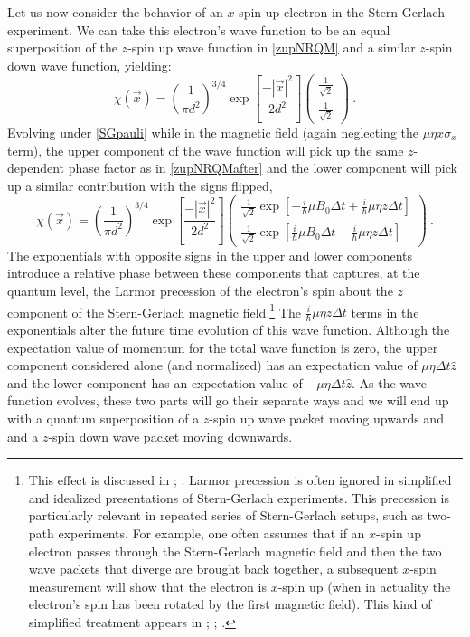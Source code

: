 \documentclass[onecolumn,secnumarabic,amsmath,amssymb,balancelastpage,nofootinbib]{article}
\begin{document}
Let us now consider the behavior of an $x$-spin up electron in the Stern-Gerlach experiment.  We can take this electron's wave function to be an equal superposition of the $z$-spin up wave function in \eqref{zupNRQM} and a similar $z$-spin down wave function, yielding:
\begin{equation}
\chi(\vec{x}) = \left(\frac{1}{\pi d^2}\right)^{3/4}  \exp\left[\frac{-|\vec{x}|^2}{2 d^2}\right] \left(\begin{matrix} \frac{1}{\sqrt{2}}\\ \frac{1}{\sqrt{2}} \end{matrix}\right)
\ .
\label{xupNRQM}
\end{equation}
Evolving under \eqref{SGpauli} while in the magnetic field (again neglecting the $\mu \eta x \sigma_x$ term), the upper component of the wave function will pick up the same $z$-dependent phase factor as in \eqref{zupNRQMafter} and the lower component will pick up a similar contribution with the signs flipped,
\begin{equation}
\chi(\vec{x}) = \left(\frac{1}{\pi d^2}\right)^{3/4} \exp\left[\frac{-|\vec{x}|^2}{2 d^2} \right] \left(\begin{matrix} \frac{1}{\sqrt{2}}\exp\left[-\frac{i}{\hbar}\mu B_0 \Delta t + \frac{i}{\hbar}\mu \eta z \Delta t\right] \\ \frac{1}{\sqrt{2}}\exp\left[\frac{i}{\hbar}\mu B_0 \Delta t - \frac{i}{\hbar}\mu \eta z \Delta t\right] \end{matrix}\right)
\ .
\label{xupNRQMafter}
\end{equation}
The exponentials with opposite signs in the upper and lower components introduce a relative phase between these components that captures, at the quantum level, the Larmor precession of the electron's spin about the $z$ component of the Stern-Gerlach magnetic field.\footnote{This effect is discussed in \citet[example 4.3]{griffithsQM}; \citet[sec.\ 12.1]{ballentine}.  Larmor precession is often ignored in simplified and idealized presentations of Stern-Gerlach experiments.  This precession is particularly relevant in repeated series of Stern-Gerlach setups, such as two-path experiments.  For example, one often assumes that if an $x$-spin up electron passes through the Stern-Gerlach magnetic field and then the two wave packets that diverge are brought back together, a subsequent $x$-spin measurement will show that the electron is $x$-spin up (when in actuality the electron's spin has been rotated by the first magnetic field).  This kind of simplified treatment appears in \citet[pg.\ 7--11]{albertQM}; \citet[pg.\ 22--25]{maudlinQM}; \citet[ch.\ 2]{barrettQM}.}  The $\frac{i}{\hbar}\mu \eta z \Delta t$ terms in the exponentials alter the future time evolution of this wave function.  Although the expectation value of momentum for the total wave function is zero, the upper component considered alone (and normalized) has an expectation value of $\mu \eta \Delta t \hat{z}$ and the lower component has an expectation value of $-\mu \eta \Delta t \hat{z}$.  As the wave function evolves, these two parts will go their separate ways and we will end up with a quantum superposition of a $z$-spin up wave packet moving upwards and and a $z$-spin down wave packet moving downwards.
\end{document}
